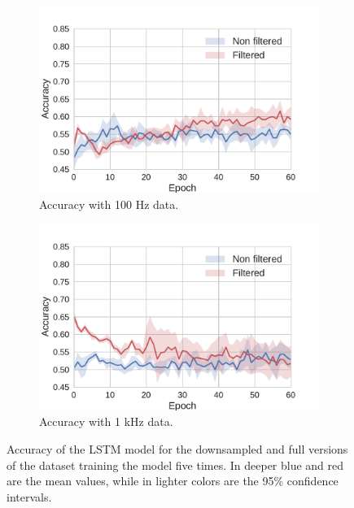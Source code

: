 \documentclass[10pt,conference,compsocconf]{IEEEtran}
\begin{document}
    
    \begin{figure}[t]
        \begin{subfigure}{0.5\textwidth}
            \centering
            \includegraphics[width=\textwidth]{figures/lstm_50.pdf}
            \caption{Accuracy with 100 Hz data.}
            \label{fig:lstm_50}
        \end{subfigure}
        \begin{subfigure}{0.5\textwidth}
            \centering
            \includegraphics[width=\textwidth]{figures/lstm_500.pdf}
            \caption{Accuracy with 1 kHz data.}
            \label{fig:lstm_500}
        \end{subfigure}
        \caption{Accuracy of the LSTM model for the downsampled and full versions of the dataset training the model five times. In deeper blue and red are the mean values, while in lighter colors are the 95\% confidence intervals.}
        \label{fig:perf_optim}
    \end{figure}
  
\end{document}
